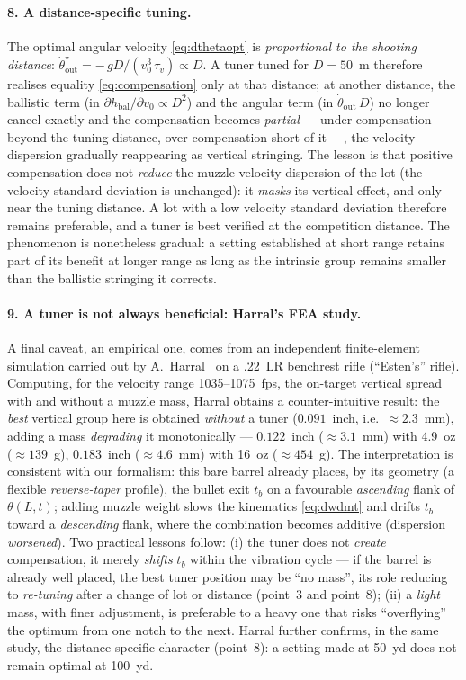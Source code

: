 \documentclass[12pt,a4paper]{article}
\begin{document}
	\paragraph{8. A distance-specific tuning.} The optimal angular velocity \eqref{eq:dthetaopt} is \emph{proportional to the shooting distance}: $\dot\theta_\text{out}^\star = -\,gD/(v_0^3\,\tau_v) \propto D$. A tuner tuned for $D = 50$~m therefore realises equality \eqref{eq:compensation} only at that distance; at another distance, the ballistic term (in $\partial h_\text{bal}/\partial v_0 \propto D^2$) and the angular term (in $\dot\theta_\text{out}\,D$) no longer cancel exactly and the compensation becomes \emph{partial} --- under-compensation beyond the tuning distance, over-compensation short of it ---, the velocity dispersion gradually reappearing as vertical stringing. The lesson is that positive compensation does not \emph{reduce} the muzzle-velocity dispersion of the lot (the velocity standard deviation is unchanged): it \emph{masks} its vertical effect, and only near the tuning distance. A lot with a low velocity standard deviation therefore remains preferable, and a tuner is best verified at the competition distance. The phenomenon is nonetheless gradual: a setting established at short range retains part of its benefit at longer range as long as the intrinsic group remains smaller than the ballistic stringing it corrects.

	\paragraph{9. A tuner is not always beneficial: Harral's FEA study.} A final caveat, an empirical one, comes from an independent finite-element simulation carried out by A.\ Harral~\cite{Harral} on a .22~LR benchrest rifle (``Esten's'' rifle). Computing, for the velocity range 1035--1075~fps, the on-target vertical spread with and without a muzzle mass, Harral obtains a counter-intuitive result: the \emph{best} vertical group here is obtained \emph{without} a tuner ($0.091$~inch, i.e.\ $\approx 2.3$~mm), adding a mass \emph{degrading} it monotonically --- $0.122$~inch ($\approx 3.1$~mm) with 4.9~oz ($\approx 139$~g), $0.183$~inch ($\approx 4.6$~mm) with 16~oz ($\approx 454$~g). The interpretation is consistent with our formalism: this bare barrel already places, by its geometry (a flexible \emph{reverse-taper} profile), the bullet exit $t_b$ on a favourable \emph{ascending} flank of $\theta(L,t)$; adding muzzle weight slows the kinematics \eqref{eq:dwdmt} and drifts $t_b$ toward a \emph{descending} flank, where the combination becomes additive (dispersion \emph{worsened}). Two practical lessons follow: (i) the tuner does not \emph{create} compensation, it merely \emph{shifts} $t_b$ within the vibration cycle --- if the barrel is already well placed, the best tuner position may be ``no mass'', its role reducing to \emph{re-tuning} after a change of lot or distance (point~3 and point~8); (ii) a \emph{light} mass, with finer adjustment, is preferable to a heavy one that risks ``overflying'' the optimum from one notch to the next. Harral further confirms, in the same study, the distance-specific character (point~8): a setting made at 50~yd does not remain optimal at 100~yd.
\end{document}
